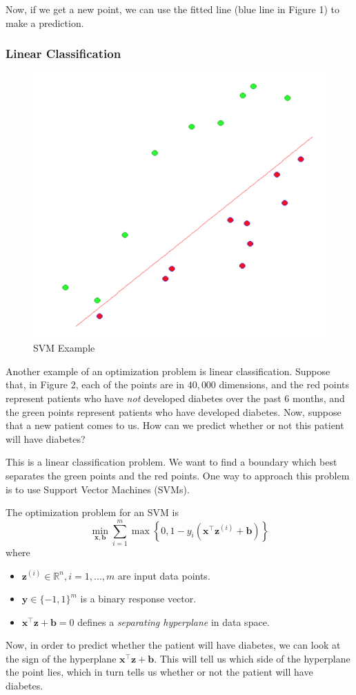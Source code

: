 \documentclass[12pt]{article}
\begin{document}
Now, if we get a new point, we can use the fitted line (blue line in Figure 1) to make a prediction. 
\subsubsection{Linear Classification}
\begin{figure}[h!]\begin{center}\includegraphics[scale=0.3]{figures/svm}\caption{SVM Example}\end{center}\end{figure}
\noindent Another example of an optimization problem is linear classification. Suppose that, in Figure 2, each of the points are in $40,000$ dimensions, and the red points represent patients who have \textit{not} developed diabetes over the past 6 months, and the green points represent patients who have developed diabetes. Now, suppose that a new patient comes to us. How can we predict whether or not this patient will have diabetes? 

\noindent This is a linear classification problem. We want to find a boundary which best separates the green points and the red points. One way to approach this problem is to use Support Vector Machines (SVMs). 

\noindent The optimization problem for an SVM is  $$\min_{\mathbf{x},\mathbf{b}} \sum_{i=1}^m \max\left\{0, 1-y_i(\mathbf{x}^\top\mathbf{z}^{(i)} + \mathbf{b})\right\}$$
where
\begin{itemize}
\item $\mathbf{z}^{(i)}\in\mathbb{R}^n,i=1,\ldots,m$ are input data points.
\item $\mathbf{y}\in\{-1,1\}^m$ is a binary response vector.
\item $\mathbf{x}^\top\mathbf{z}+\mathbf{b} = 0$ defines a \textit{separating hyperplane} in data space.
\end{itemize}
Now, in order to predict whether the patient will have diabetes, we can look at the sign of the hyperplane $\mathbf{x}^\top\mathbf{z}+\mathbf{b}$. This will tell us which side of the hyperplane the point lies, which in turn tells us whether or not the patient will have diabetes.
\end{document}
